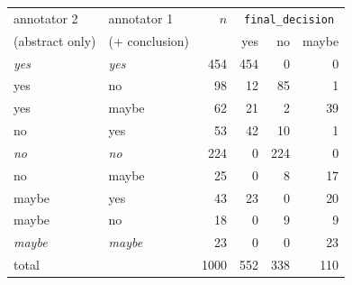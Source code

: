 \begin{tabular}{llrrrr}
\toprule
annotator 2 & annotator 1 & $n$ & \multicolumn{3}{c}{\texttt{final\_decision}} \\
(abstract only) & (+ conclusion) & & yes & no & maybe \\
\midrule
\textit{yes} & \textit{yes} & 454 & 454 & 0 & 0 \\
{yes} & {no} & 98 & 12 & 85 & 1 \\
{yes} & {maybe} & 62 & 21 & 2 & 39 \\
\addlinespace
{no} & {yes} & 53 & 42 & 10 & 1 \\
\textit{no} & \textit{no} & 224 & 0 & 224 & 0 \\
{no} & {maybe} & 25 & 0 & 8 & 17 \\
\addlinespace
{maybe} & {yes} & 43 & 23 & 0 & 20 \\
{maybe} & {no} & 18 & 0 & 9 & 9 \\
\textit{maybe} & \textit{maybe} & 23 & 0 & 0 & 23 \\
\midrule
\multicolumn{2}{l}{total} & 1000 & 552 & 338 & 110 \\
\bottomrule
\end{tabular}
